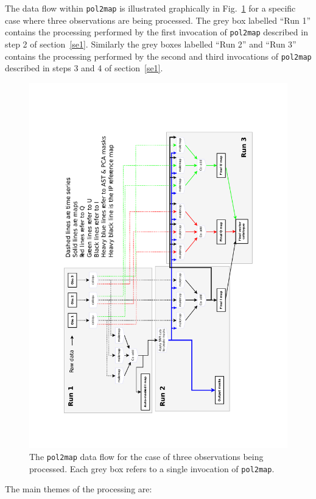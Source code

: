 \documentclass[twoside,11pt]{starlink}
\begin{document}
The data flow within \texttt{pol2map} is illustrated graphically in
Fig.~\ref{fig:flow} for a specific case where three observations are
being processed. The grey box labelled ``Run 1'' contains the processing
performed by the first invocation of \texttt{pol2map} described in step 2
of section~\ref{se1}. Similarly the grey boxes labelled ``Run 2'' and ``Run
3'' contains the processing performed by the second and third invocations
of \texttt{pol2map} described in steps 3 and 4 of section~\ref{se1}.

\begin{figure}
\includegraphics[width=.99\linewidth]{pol2map_flow.pdf}
\caption{The \texttt{pol2map} data flow for the case of three
observations being processed. Each grey box refers to a single invocation
of \texttt{pol2map}.}
\label{fig:flow}
\end{figure}

The main themes of the processing are:
\end{document}
